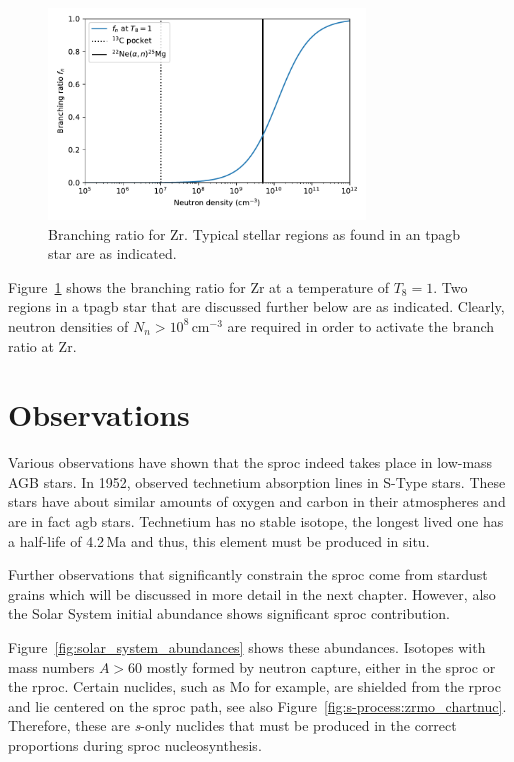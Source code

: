 \begin{figure}[tb]
    \centering
    \includegraphics[width=0.75\textwidth]{graphics/s-process/branching_zr95}
    \caption{Branching ratio for Zr. Typical stellar regions as found in an \ac{tpagb} star are as indicated.}
    \label{fig:s-process:branching_zr95}
\end{figure}
Figure~\ref{fig:s-process:branching_zr95} shows the branching ratio for Zr at a temperature of $T_8 = 1$. Two regions in a \ac{tpagb} star that are discussed further below are as indicated. Clearly, neutron densities of $N_n > 10^8$\,cm$^{-3}$ are required in order to activate the branch ratio at Zr.


\section{Observations}

Various observations have shown that the \ac{sproc} indeed takes place in low-mass AGB stars. In 1952, \citeauthor{merrill52} observed technetium absorption lines in S-Type stars. These stars have about similar amounts of oxygen and carbon in their atmospheres and are in fact \ac{agb} stars. Technetium has no stable isotope, the longest lived one has a half-life of 4.2\,Ma and thus, this element must be produced in situ.

Further observations that significantly constrain the \ac{sproc} come from stardust grains which will be discussed in more detail in the next chapter. However, also the Solar System initial abundance shows significant \ac{sproc} contribution.

Figure~\ref{fig:solar_system_abundances} shows these abundances. Isotopes with mass numbers $A>60$ mostly formed by neutron capture, either in the \ac{sproc} or the \ac{rproc}. Certain nuclides, such as Mo for example, are shielded from the \ac{rproc} and lie centered on the \ac{sproc} path, see also Figure~\ref{fig:s-process:zrmo_chartnuc}. Therefore, these are \textit{s}-only nuclides that must be produced in the correct proportions during \ac{sproc} nucleosynthesis.


